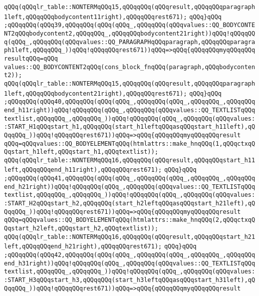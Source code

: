 \verb|qQQq(qQQqlr_table::NONTERMqQQq15,qQQqqQQq(qQQqresult,qQQqqQQqparagraph1left,qQQqqQQqbodycontent11right),qQQqqQQqrest671);|\newline
\verb|qQQq}qQQq|\newline
\verb|;qQQqqQQq(qQQq39,qQQqqQQq(qQQq(qQQq_,qQQqqQQq(qQQqvalues::QQ_BODYCONTENT2qQQqbodycontent2,qQQqqQQq_,qQQqqQQqbodycontent21right))qQQq!qQQqqQQq(qQQq_,qQQqqQQq(qQQqvalues::QQ_PARAGRAPHqQQqparagraph,qQQqqQQqparagraph1left,qQQqqQQq_))qQQq!qQQqqQQqrest671))qQQq=>qQQq{qQQqqQQqmyqQQqqQQqresultqQQq=qQQq|\newline
\verb|values::QQ_BODYCONTENT2qQQq(cons_block_fnqQQq(paragraph,qQQqbodycontent2));|\newline
\verb|qQQq(qQQqlr_table::NONTERMqQQq15,qQQqqQQq(qQQqresult,qQQqqQQqparagraph1left,qQQqqQQqbodycontent21right),qQQqqQQqrest671);|\newline
\verb|qQQq}qQQq|\newline
\verb|;qQQqqQQq(qQQq40,qQQqqQQq(qQQq(qQQq_,qQQqqQQq(qQQq_,qQQqqQQq_,qQQqqQQqend_h11right))qQQq!qQQqqQQq(qQQq_,qQQqqQQq(qQQqvalues::QQ_TEXTLISTqQQqtextlist,qQQqqQQq_,qQQqqQQq_))qQQq!qQQqqQQq(qQQq_,qQQqqQQq(qQQqvalues::START_H1qQQqstart_h1,qQQqqQQq(start_h1leftqQQqasqQQqstart_h11left),qQQqqQQq_))qQQq!qQQqqQQqrest671))qQQq=>qQQq{qQQqqQQqmyqQQqqQQqresult|\newline
\verb|qQQq=qQQqvalues::QQ_BODYELEMENTqQQq(htmlattrs::make_hnqQQq(1,qQQqctxqQQqstart_h1left,qQQqstart_h1,qQQqtextlist));|\newline
\verb|qQQq(qQQqlr_table::NONTERMqQQq16,qQQqqQQq(qQQqresult,qQQqqQQqstart_h11left,qQQqqQQqend_h11right),qQQqqQQqrest671);|\newline
\verb|qQQq}qQQq|\newline
\verb|;qQQqqQQq(qQQq41,qQQqqQQq(qQQq(qQQq_,qQQqqQQq(qQQq_,qQQqqQQq_,qQQqqQQqend_h21right))qQQq!qQQqqQQq(qQQq_,qQQqqQQq(qQQqvalues::QQ_TEXTLISTqQQqtextlist,qQQqqQQq_,qQQqqQQq_))qQQq!qQQqqQQq(qQQq_,qQQqqQQq(qQQqvalues::START_H2qQQqstart_h2,qQQqqQQq(start_h2leftqQQqasqQQqstart_h21left),qQQqqQQq_))qQQq!qQQqqQQqrest671))qQQq=>qQQq{qQQqqQQqmyqQQqqQQqresult|\newline
\verb|qQQq=qQQqvalues::QQ_BODYELEMENTqQQq(htmlattrs::make_hnqQQq(2,qQQqctxqQQqstart_h2left,qQQqstart_h2,qQQqtextlist));|\newline
\verb|qQQq(qQQqlr_table::NONTERMqQQq16,qQQqqQQq(qQQqresult,qQQqqQQqstart_h21left,qQQqqQQqend_h21right),qQQqqQQqrest671);|\newline
\verb|qQQq}qQQq|\newline
\verb|;qQQqqQQq(qQQq42,qQQqqQQq(qQQq(qQQq_,qQQqqQQq(qQQq_,qQQqqQQq_,qQQqqQQqend_h31right))qQQq!qQQqqQQq(qQQq_,qQQqqQQq(qQQqvalues::QQ_TEXTLISTqQQqtextlist,qQQqqQQq_,qQQqqQQq_))qQQq!qQQqqQQq(qQQq_,qQQqqQQq(qQQqvalues::START_H3qQQqstart_h3,qQQqqQQq(start_h3leftqQQqasqQQqstart_h31left),qQQqqQQq_))qQQq!qQQqqQQqrest671))qQQq=>qQQq{qQQqqQQqmyqQQqqQQqresult|\newline
